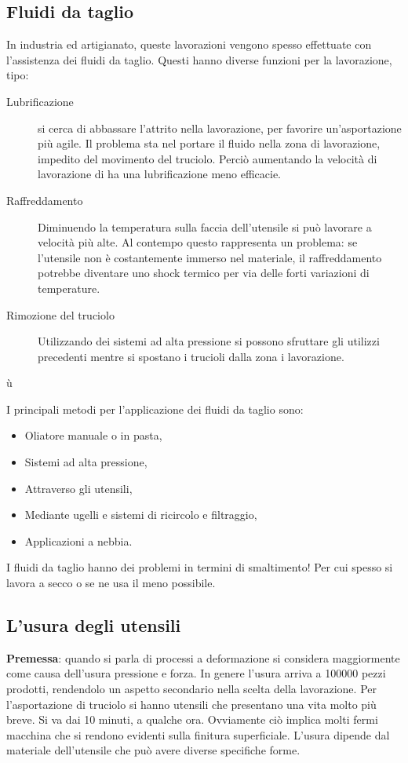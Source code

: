 \subsection{Fluidi da taglio}
In industria ed artigianato, queste lavorazioni vengono spesso
effettuate con l'assistenza dei fluidi da taglio.
Questi hanno diverse funzioni per la lavorazione, tipo:

\begin{description}
\item[Lubrificazione] si cerca di abbassare l'attrito nella
lavorazione, per favorire un'asportazione più agile.
Il problema sta nel portare il fluido nella zona di lavorazione,
impedito del movimento del truciolo.
Perciò aumentando la velocità di lavorazione di ha una 
lubrificazione meno efficacie.
\item[Raffreddamento] Diminuendo la temperatura sulla faccia 
dell'utensile si può lavorare a velocità più alte.
Al contempo questo rappresenta un problema: se l'utensile non è 
costantemente immerso nel materiale, il raffreddamento potrebbe
diventare uno shock termico per via delle forti variazioni di 
temperature.
\item[Rimozione del truciolo] Utilizzando dei sistemi ad alta
pressione si possono sfruttare gli utilizzi precedenti mentre 
si spostano i trucioli dalla zona i lavorazione.
\end{description}ù

I principali metodi per l'applicazione dei fluidi da taglio sono:
\begin{itemize}
\item Oliatore manuale o in pasta,
\item Sistemi ad alta pressione,
\item Attraverso gli utensili,
\item Mediante ugelli e sistemi di ricircolo e filtraggio,
\item Applicazioni a nebbia.
\end{itemize}

I fluidi da taglio hanno dei problemi in termini di smaltimento!
Per cui spesso si lavora a secco o se ne usa il meno possibile.

\subsection{L'usura degli utensili}
\textbf{Premessa}: quando si parla di processi a deformazione si considera maggiormente come causa dell'usura pressione e forza.
In genere l'usura arriva a 100000 pezzi prodotti, rendendolo un aspetto secondario nella scelta della lavorazione.
Per l'asportazione di truciolo si hanno utensili che presentano una vita molto più breve. Si va dai 10 minuti, a qualche ora.
Ovviamente ciò implica molti fermi macchina che si rendono evidenti sulla finitura superficiale.
L'usura dipende dal materiale dell'utensile che può avere diverse specifiche forme.

